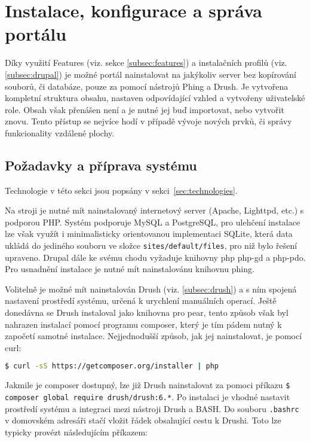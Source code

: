 \chapter{Instalace, konfigurace a správa portálu}
\label{chap:instalace}

Díky využití Features (viz. sekce \ref{subsec:features}) a instalačních profilů (viz. \ref{subsec:drupal}) je možné portál nainstalovat na jakýkoliv server bez kopírování souborů, či databáze, pouze za pomocí nástrojů Phing a Drush. Je vytvořena kompletní struktura obsahu, nastaven odpovídající vzhled a vytvořeny uživatelské role. Obsah však přenášen není a je nutné jej buď importovat, nebo vytvořit znovu. Tento přístup se nejvíce hodí v případě vývoje nových prvků, či správy funkcionality vzdálené plochy.

\section{Požadavky a příprava systému}

Technologie v této sekci jsou popsány v sekci~\ref{sec:technologies}.

Na stroji je nutné mít nainstalovaný internetový server (Apache, Lighttpd, etc.) s podporou PHP. Systém podporuje MySQL a PostgreSQL, pro ulehčení instalace lze však využít i minimalisticky orientovanou implementaci SQLite, která data ukládá do jediného souboru ve složce \texttt{sites/default/files}, pro niž bylo řešení upraveno. Drupal dále ke svému chodu vyžaduje knihovny php php-gd a php-pdo. Pro usnadnění instalace je nutné mít nainstalovánu knihovnu phing.

Volitelně je možné mít nainstalován Drush (viz. \ref{subsec:drush}) a s ním spojená nastavení prostředí systému, určená k urychlení manuálních operací. Ještě donedávna se Drush instaloval jako knihovna pro \gls{pear}, tento způsob však byl nahrazen instalací pomocí programu \gls{composer}, který je tím pádem nutný k započetí samotné instalace. Nejjednodušší způsob, jak jej nainstalovat, je pomocí \gls{curl}:

\begin{lstlisting}[language=bash]
  $ curl -sS https://getcomposer.org/installer | php
\end{lstlisting}

Jakmile je composer dostupný, lze již Drush nainstalovat za pomoci příkazu \texttt{\$ composer global require drush/drush:6.*}. Po instalaci je vhodné nastavit prostředí systému a integraci mezi nástroji Drush a BASH. Do souboru \texttt{.bashrc} v domovském adresáři stačí vložit řádek obsahující cestu k Drushi. Toto lze typicky provézt následujícím příkazem:


